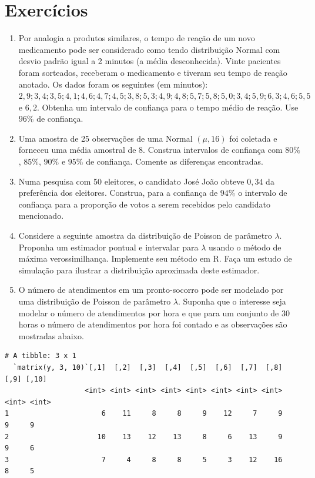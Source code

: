 \documentclass[10pt,a4paper]{book}
\begin{document}
\section*{Exercícios}\label{exercuxedcios-18}


\begin{enumerate}
\def\labelenumi{\arabic{enumi}.}
\item
  Por analogia a produtos similares, o tempo de reação de um novo
  medicamento pode ser considerado como tendo distribuição Normal com
  desvio padrão igual a 2 minutos (a média desconhecida). Vinte
  pacientes foram sorteados, receberam o medicamento e tiveram seu tempo
  de reação anotado. Os dados foram os seguintes (em minutos):
  \(2,9; 3,4; 3,5; 4,1; 4,6; 4,7; 4,5; 3,8; 5,3; 4,9; 4,8; 5,7; 5,8; 5,0; 3,4; 5,9; 6,3; 4,6; 5,5\)
  e \(6,2\). Obtenha um intervalo de confiança para o tempo médio de
  reação. Use \(96\%\) de confiança.
\item
  Uma amostra de 25 observações de uma Normal \((\mu, 16)\) foi coletada
  e forneceu uma média amostral de 8. Construa intervalos de confiança
  com \(80\%\), \(85\%\), \(90\%\) e \(95\%\) de confiança. Comente as
  diferenças encontradas.
\item
  Numa pesquisa com 50 eleitores, o candidato José João obteve \(0,34\)
  da preferência dos eleitores. Construa, para a confiança de \(94\%\) o
  intervalo de confiança para a proporção de votos a serem recebidos
  pelo candidato mencionado.
\item
  Considere a seguinte amostra da distribuição de Poisson de parâmetro
  \(\lambda\). Proponha um estimador pontual e intervalar para
  \(\lambda\) usando o método de máxima verossimilhança. Implemente seu
  método em R. Faça um estudo de simulação para ilustrar a distribuição
  aproximada deste estimador.
\item
  O número de atendimentos em um pronto-socorro pode ser modelado por
  uma distribuição de Poisson de parâmetro \(\lambda\). Suponha que o
  interesse seja modelar o número de atendimentos por hora e que para um
  conjunto de \(30\) horas o número de atendimentos por hora foi contado
  e as observações são mostradas abaixo.
\end{enumerate}

\begin{verbatim}
# A tibble: 3 x 1
  `matrix(y, 3, 10)`[,1]  [,2]  [,3]  [,4]  [,5]  [,6]  [,7]  [,8]  [,9] [,10]
                   <int> <int> <int> <int> <int> <int> <int> <int> <int> <int>
1                      6    11     8     8     9    12     7     9     9     9
2                     10    13    12    13     8     6    13     9     9     6
3                      7     4     8     8     5     3    12    16     8     5
\end{verbatim}
\end{document}
